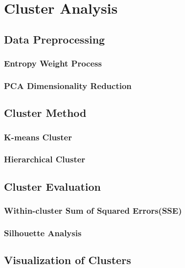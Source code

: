 
\chapter{Cluster Analysis}



\section{Data Preprocessing}
\subsection{Entropy Weight Process}

\subsection{PCA Dimensionality Reduction}
\section{Cluster Method}

\subsection{K-means Cluster}

\subsection{Hierarchical Cluster}

\section{Cluster Evaluation}

\subsection{Within-cluster Sum of Squared Errors(SSE)}

\subsection{Silhouette Analysis}

\section{Visualization of Clusters}